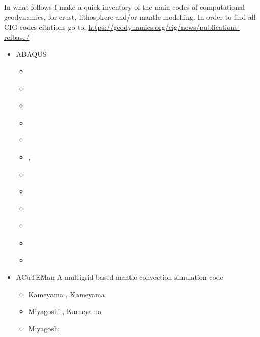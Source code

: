 
In what follows I make a quick inventory of the main codes of computational geodynamics, 
for crust, lithosphere and/or mantle modelling.
In order to find all CIG-codes citations go to: 
\url{https://geodynamics.org/cig/news/publications-refbase/}

\begin{itemize}

\item {\codefont ABAQUS} 

\begin{scriptsize}
\begin{itemize}
\item[\twothousandone]       \textcite{brry01}
\item[\twothousandtwo]       \textcite{gedh02}
\item[\twothousandthree]     \textcite{fumr03}
\item[\twothousandsix]       \textcite{hapf06}
\item[\twothousandseven]     \textcite{camg07}
\item[\twothousandnine]      \textcite{kuhe09}, \textcite{makh09}
\item[\twothousandten]       \textcite{camg10}
\item[\twothousandtwelve]    \textcite{nalr12}
\item[\twothousandthirteen]  \textcite{soyl13}
\item[\twothousandfifteen]   \textcite{pevp15}
\item[\twothousandseventeen] \textcite{naam17}
\item[\twothousandeighteen]  \textcite{naam18}
\end{itemize}
\end{scriptsize}

\item {\codefont ACuTEMan} 
A multigrid-based mantle convection simulation code

\begin{scriptsize}
\begin{itemize}
\item[\twothousandfive] Kameyama \cite{kame05}, Kameyama \etal \cite{kaks05}
\item[\twothousandfifteen] Miyagoshi \etal \cite{miko15}, Kameyama \etal \cite{kamo15}
\item[\twothousandtwenty] Miyagoshi \etal \cite{miko20} 
\end{itemize}
\end{scriptsize}


\end{itemize}
